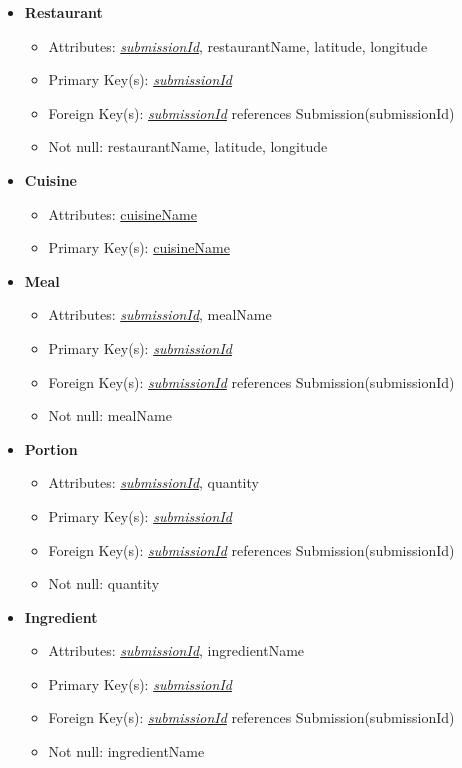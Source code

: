 \documentclass{article}
\begin{document}
\begin{itemize}
        \item \textbf{Restaurant}
        \begin{itemize}
            \item Attributes: \underline{\textit{submissionId}}, restaurantName, latitude, longitude
            \item Primary Key(s): \underline{\textit{submissionId}}
            \item Foreign Key(s): \underline{\textit{submissionId}} references Submission(submissionId)
            \item Not null: restaurantName, latitude, longitude
        \end{itemize}
    
        \item \textbf{Cuisine}
        \begin{itemize}
            \item Attributes: \underline{cuisineName}
            \item Primary Key(s): \underline{cuisineName}        
        \end{itemize}

        \item \textbf{Meal}
        \begin{itemize}
            \item Attributes: \underline{\textit{submissionId}}, mealName
            \item Primary Key(s): \underline{\textit{submissionId}}
            \item Foreign Key(s): \underline{\textit{submissionId}} references Submission(submissionId)
            \item Not null: mealName
        \end{itemize}

        \item \textbf{Portion}
        \begin{itemize}
            \item Attributes: \underline{\textit{submissionId}}, quantity
            \item Primary Key(s): \underline{\textit{submissionId}}
            \item Foreign Key(s): \underline{\textit{submissionId}} references Submission(submissionId)
            \item Not null: quantity
        \end{itemize}

        \item \textbf{Ingredient}
        \begin{itemize}
            \item Attributes: \underline{\textit{submissionId}}, ingredientName
            \item Primary Key(s): \underline{\textit{submissionId}}
            \item Foreign Key(s): \underline{\textit{submissionId}} references Submission(submissionId)
            \item Not null: ingredientName
        \end{itemize}


\end{itemize}
\end{document}
